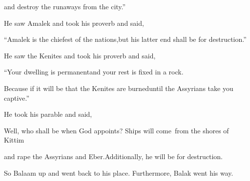 \begin{inparaenum}
  \pb{}and destroy the runaways from the city.''%

  \noindent{} He saw Amalek and took his proverb and said,%

  \pb{}``Amalek is the chiefest of the nations,\pa{}but his latter end shall be for destruction.''%

  \noindent{} He saw the Kenites and took his proverb and said,%

  \pb{}``Your dwelling is permanent\pa{}and your rest is fixed in a rock.%

  \pa{} Because if it will be that the Kenites are burned\pa{}until the Assyrians take you captive.''%

  \noindent{} He took his parable and said,%

  \pb{}Well, who shall be when God appoints?  Ships will come\understood{}\ from the shores of Kittim%

  \pb{}and rape the Assyrians and Eber.\pa{}Additionally, he will be for destruction.%

  \noindent{} So Balaam up and went back to his place. Furthermore, Balak went his way.%
\end{inparaenum}
